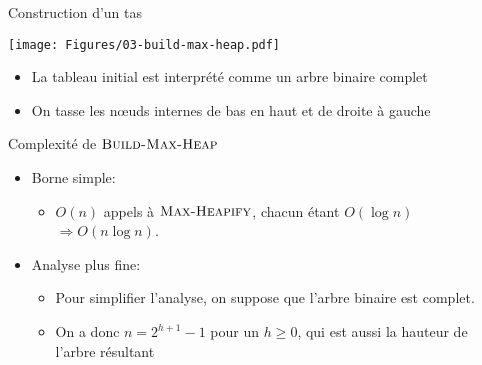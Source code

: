 \begin{frame}{Construction d'un tas}

\begin{center}
\end{center}

\bigskip

\centerline{\texttt{[image: Figures/03-build-max-heap.pdf]}}

\bigskip

\begin{itemize}
\item La tableau initial est interprété comme un arbre binaire complet
\item On tasse les n\oe uds internes de bas en haut et de droite à gauche
\end{itemize}


\end{frame}

\begin{frame}{Complexité de $\textnormal{\scshape Build-Max-Heap}$}

\begin{itemize}
\item Borne simple:
\begin{itemize}
\item $O(n)$ appels à $\textnormal{\scshape Max-Heapify}$, chacun étant $O(\log n)$ $\Rightarrow O(n\log n)$.
\end{itemize}

\bigskip


\item Analyse plus fine:
\begin{itemize}
\item Pour simplifier l'analyse, on suppose que l'arbre binaire est complet.
\item On a donc $n=2^{h+1}-1$ pour un $h\geq 0$, qui est aussi la hauteur de l'arbre résultant
\end{itemize}
\end{itemize}


\end{frame}

